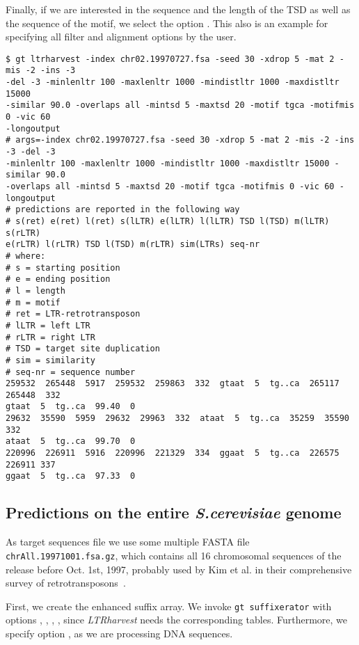 \documentclass[12pt,titlepage]{article}
\newcommand{\LTRharvest}{\textit{LTRharvest}\xspace}
\newcommand{\Gtsuffixerator}{\texttt{gt suffixerator}\xspace}
\begin{document}
Finally, if we are interested in the sequence and the length of the TSD
as well as the sequence of the motif, we select the option 
.
This also is an example for specifying all filter and alignment 
options by the user.

\begin{footnotesize}
\begin{verbatim}
$ gt ltrharvest -index chr02.19970727.fsa -seed 30 -xdrop 5 -mat 2 -mis -2 -ins -3
-del -3 -minlenltr 100 -maxlenltr 1000 -mindistltr 1000 -maxdistltr 15000
-similar 90.0 -overlaps all -mintsd 5 -maxtsd 20 -motif tgca -motifmis 0 -vic 60
-longoutput
# args=-index chr02.19970727.fsa -seed 30 -xdrop 5 -mat 2 -mis -2 -ins -3 -del -3
-minlenltr 100 -maxlenltr 1000 -mindistltr 1000 -maxdistltr 15000 -similar 90.0
-overlaps all -mintsd 5 -maxtsd 20 -motif tgca -motifmis 0 -vic 60 -longoutput
# predictions are reported in the following way 
# s(ret) e(ret) l(ret) s(lLTR) e(lLTR) l(lLTR) TSD l(TSD) m(lLTR) s(rLTR) 
e(rLTR) l(rLTR) TSD l(TSD) m(rLTR) sim(LTRs) seq-nr
# where:
# s = starting position
# e = ending position
# l = length
# m = motif
# ret = LTR-retrotransposon 
# lLTR = left LTR
# rLTR = right LTR
# TSD = target site duplication
# sim = similarity
# seq-nr = sequence number
259532  265448  5917  259532  259863  332  gtaat  5  tg..ca  265117  265448  332
gtaat  5  tg..ca  99.40  0
29632  35590  5959  29632  29963  332  ataat  5  tg..ca  35259  35590  332
ataat  5  tg..ca  99.70  0
220996  226911  5916  220996  221329  334  ggaat  5  tg..ca  226575  226911 337  
ggaat  5  tg..ca  97.33  0
\end{verbatim}
\end{footnotesize}

\subsection{Predictions on the entire \textit{S.cerevisiae} genome}
\label{Example-genome}

As target sequences file we use some multiple FASTA file
\texttt{\small{chrAll.19971001.fsa.gz}}, which contains all 16
chromosomal sequences of the release before Oct. 1st, 1997, probably 
used by Kim et al.
in their comprehensive survey of retrotransposons~\cite{kim:1998}.

First, we create the enhanced suffix array.
We invoke \Gtsuffixerator with options , 
, , , since 
\LTRharvest needs the corresponding tables. Furthermore, we specify option
, as we are processing DNA sequences.
\end{document}
